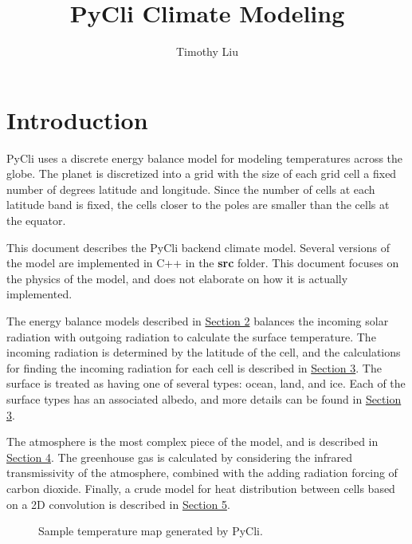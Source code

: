 \documentclass[12pt]{article} %
\title{PyCli Climate Modeling}
\author{Timothy Liu}
\begin{document}
\maketitle

\tableofcontents

\newpage

\section{Introduction}
PyCli uses a discrete energy balance model for modeling temperatures across the globe. The planet is discretized into a grid with the size of each grid cell a fixed number of degrees latitude and longitude. Since the number of cells at each latitude band is fixed, the cells closer to the poles are smaller than the cells at the equator.

This document describes the PyCli backend climate model. Several versions of the model are implemented in C++ in the \textbf{src} folder. This document focuses on the physics of the model, and does not elaborate on how it is actually implemented.

The energy balance models described in \hyperref[sec:model]{Section 2} balances the incoming solar radiation with outgoing radiation to calculate the surface temperature. The incoming radiation is determined by the latitude of the cell, and the calculations for finding the incoming radiation for each cell is described in \hyperref[sec:radiation]{Section 3}.  The surface is treated as having one of several types: ocean, land, and ice. Each of the surface types has an associated albedo, and more details can be found in \hyperref[sec:surface]{Section 3}. 

The atmosphere is the most complex piece of the model, and is described in \hyperref[sec:atmos]{Section 4}. The greenhouse gas is calculated by considering the infrared transmissivity of the atmosphere, combined with the adding radiation forcing of carbon dioxide. Finally, a crude model for heat distribution between cells based on a 2D convolution is described in \hyperref[sec:heatflow]{Section 5}.

\begin{figure}[H]
	\caption{Sample temperature map generated by PyCli.}
	\label{fig:sampleout}
\end{figure}
\end{document}
